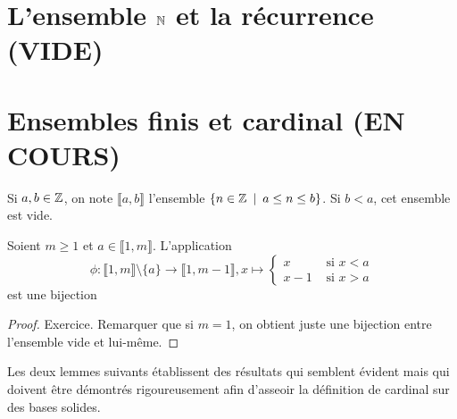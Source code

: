 
\section{L'ensemble $\mathbb{N}$ et la récurrence (VIDE)}

\section{Ensembles finis et cardinal (EN COURS)}

Si $a, b\in \mathbb{Z}$, on note $\llbracket a,b\rrbracket$ l'ensemble $\{n\in \mathbb{Z}\:\mid\: a\leq n \leq b\}$. Si $b<a$, cet ensemble est vide.

\begin{lemme} Soient $m\geq 1$ et $a\in \llbracket 1,m\rrbracket$. L'application 
\[
\phi : \llbracket 1,m\rrbracket \setminus \{a\} \to \llbracket 1,m-1\rrbracket, 
x\mapsto \begin{cases}x & \text{ si }x<a\\x-1 & \text{ si }x>a\end{cases}
\]
est une bijection
\end{lemme}
\begin{proof} Exercice. Remarquer que si $m=1$, on obtient juste une bijection entre l'ensemble vide et lui-même.
\end{proof}


Les deux lemmes suivants établissent des résultats qui semblent \og évident\fg{} mais qui doivent être démontrés rigoureusement afin d'asseoir la définition de cardinal sur des bases solides.

